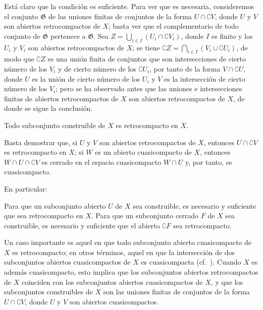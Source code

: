 Está claro que la condición es suficiente.
Para ver que es necesaria, consideremos el conjunto $\mathfrak{G}$ de las uniones finitas de conjuntos de la forma $U\cap\complement{V}$, donde $U$ y $V$ son abiertos retrocompactos de $X$; basta ver que el complementario de todo conjunto de $\mathfrak{G}$ pertenece a $\mathfrak{G}$.
Sea $Z=\bigcup_{i\in I}(U_i\cap\complement{V_i})$, donde $I$ es finito y los $U_i$ y $V_i$ son abiertos retrocompactos de $X$; se tiene
$\complement{Z}=\bigcap_{i\in I}(V_i\cup\complement{U_i})$, de modo que $\complement{Z}$ es una unión finita de conjuntos que son intersecciones de cierto número de los $V_i$ y de cierto número de los $\complement{U_i}$, por tanto de la forma
$V\cap\complement{U}$, donde $U$ es la unión de cierto número de los $U_i$ y $V$ es la intersección de cierto número de los $V_i$; pero se ha observado antes que las uniones e intersecciones finitas de abiertos retrocompactos de $X$ son abiertos retrocompactos de $X$, de donde se sigue la conclusión.


\begin{corollary}[9.1.4]
\label{0.9.1.4}
\label{0.9.1.4-fr}
Todo subconjunto construible de $X$ es retrocompacto en $X$.
\end{corollary}


Basta demostrar que, si $U$ y $V$ son abiertos retrocompactos de $X$, entonces $U\cap\complement{V}$ es retrocompacto en $X$; si $W$ es un abierto cuasicompacto de $X$, entonces $W\cap U\cap\complement{V}$ es cerrado en el espacio cuasicompacto $W\cap U$ y, por tanto, es cuasicompacto.


En particular:
\begin{corollary}[9.1.5]
\label{0.9.1.5}
\label{0.9.1.5-fr}
Para que un subconjunto abierto $U$ de $X$ sea construible, es necesario y suficiente que sea retrocompacto en $X$.
Para que un subconjunto cerrado $F$ de $X$ sea construible, es necesario y suficiente que el abierto $\complement{F}$ sea retrocompacto.
\end{corollary}

\begin{env}[9.1.6]
\label{0.9.1.6}
\label{0.9.1.6-fr}
Un caso importante es aquel en que todo subconjunto abierto cuasicompacto de $X$ es retrocompacto; en otros términos, aquel en que la intersección de dos subconjuntos abiertos cuasicompactos de $X$ es cuasicompacta (cf.~).
Cuando $X$ es además cuasicompacto, esto implica que los subconjuntos abiertos retrocompactos de $X$ coinciden con los subconjuntos abiertos cuasicompactos de $X$, y que los subconjuntos construibles de $X$ son las uniones finitas de conjuntos de la forma $U\cap\complement{V}$, donde $U$ y $V$ son abiertos cuasicompactos.
\end{env}

